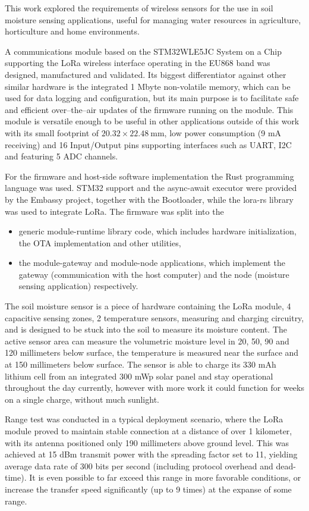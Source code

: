 
This work explored the requirements of wireless sensors for the use in soil moisture sensing applications, useful for managing water resources in agriculture, horticulture and home environments.

A communications module based on the STM32WLE5JC System on a Chip supporting the LoRa wireless interface operating in the EU868 band was designed, manufactured and validated. Its biggest differentiator against other similar hardware is the integrated 1 Mbyte non-volatile memory, which can be used for data logging and configuration, but its main purpose is to facilitate safe and efficient over--the--air updates of the firmware running on the module. This module is versatile enough to be useful in other applications outside of this work with its small footprint of $20.32 \times 22.48~\mathrm{mm}$, low power consumption (9 mA receiving) and 16 Input/Output pins supporting interfaces such as UART, I2C and featuring 5 ADC channels.

For the firmware and host-side software implementation the Rust programming language was used. STM32 support and the async-await executor were provided by the Embassy project, together with the Bootloader, while the lora-rs library was used to integrate LoRa. The firmware was split into the 
\begin{itemize}
    \item generic module-runtime library code, which includes hardware initialization, the OTA implementation and other utilities,
    \item the module-gateway and module-node applications, which implement the gateway (communication with the host computer) and the node (moisture sensing application) respectively.
\end{itemize}

The soil moisture sensor is a piece of hardware containing the LoRa module, 4 capacitive sensing zones, 2 temperature sensors, measuring and charging circuitry, and is designed to be stuck into the soil to measure its moisture content. The active sensor area can measure the volumetric moisture level in 20, 50, 90 and 120 millimeters below surface, the temperature is measured near the surface and at 150 millimeters below surface. The sensor is able to charge its 330 mAh lithium cell from an integrated 300 mWp solar panel and stay operational throughout the day currently, however with more work it could function for weeks on a single charge, without much sunlight.

Range test was conducted in a typical deployment scenario, where the LoRa module proved to maintain stable connection at a distance of over 1 kilometer, with its antenna positioned only 190 millimeters above ground level. This was achieved at 15 dBm transmit power with the spreading factor set to 11, yielding average data rate of 300 bits per second (including protocol overhead and dead-time). It is even possible to far exceed this range in more favorable conditions, or increase the transfer speed significantly (up to 9 times) at the expanse of some range.
